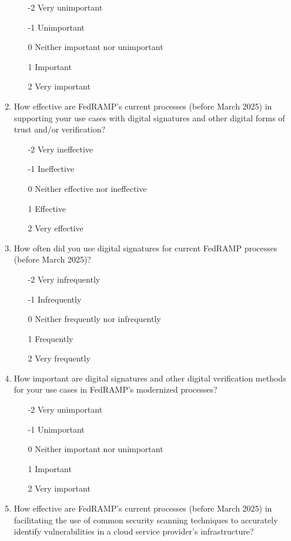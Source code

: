 \documentclass{jdf}
\begin{document}
\begin{enumerate}
\begin{enumerate}
        \item [-2] Very unimportant
        \item [-1] Unimportant
        \item  [0] Neither important nor unimportant
        \item  [1] Important
        \item  [2] Very important
    \end{enumerate}
    \item How effective are FedRAMP's current processes (before March 2025) in supporting your use cases with digital signatures and other digital forms of trust and/or verification?
    \begin{enumerate}
        \item [-2] Very ineffective
        \item [-1] Ineffective
        \item  [0] Neither effective nor ineffective
        \item  [1] Effective 
        \item  [2] Very effective
    \end{enumerate}
    \item How often did you use digital signatures for current FedRAMP processes (before March 2025)?
    \begin{enumerate}
        \item [-2] Very infrequently
        \item [-1] Infrequently
        \item  [0] Neither frequently nor infrequently
        \item  [1] Frequently 
        \item  [2] Very frequently
    \end{enumerate}
    \item How important are digital signatures and other digital verification methods for your use cases in FedRAMP's modernized processes?
    \begin{enumerate}
        \item [-2] Very unimportant
        \item [-1] Unimportant
        \item  [0] Neither important nor unimportant
        \item  [1] Important
        \item  [2] Very important
    \end{enumerate}
    \item How effective are FedRAMP's current processes (before March 2025) in facilitating the use of common security scanning techniques to accurately identify vulnerabilities in a cloud service provider's infrastructure?

\end{enumerate}
\end{document}
